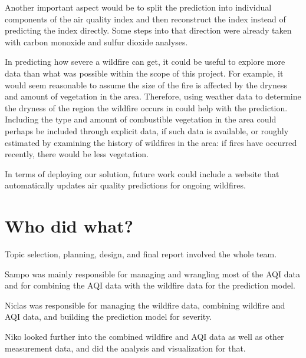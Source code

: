 \documentclass[a4paper,12pt]{article}
\begin{document}
Another important aspect would be to split the prediction into individual components of the air quality index and then reconstruct the index instead of predicting the index directly. Some steps into that direction were already taken with carbon monoxide and sulfur dioxide analyses.

In predicting how severe a wildfire can get, it could be useful to explore more data than what was possible within the scope of this project. For example, it would seem reasonable to assume the size of the fire is affected by the dryness and amount of vegetation in the area. Therefore, using weather data to determine the dryness of the region the wildfire occurs in could help with the prediction. Including the type and amount of combustible vegetation in the area could perhaps be included through explicit data, if such data is available, or roughly estimated by examining the history of wildfires in the area: if fires have occurred recently, there would be less vegetation.

In terms of deploying our solution, future work could include a website that automatically updates air quality predictions for ongoing wildfires.

\section{Who did what?}

Topic selection, planning, design, and final report involved the whole team.

Sampo was mainly responsible for managing and wrangling most of the AQI data and for combining the AQI data with the wildfire data for the prediction model.

Niclas was responsible for managing the wildfire data, combining wildfire and AQI data, and building the prediction model for severity.

Niko looked further into the combined wildfire and AQI data as well as other measurement data, and did the analysis and visualization for that.
\end{document}

